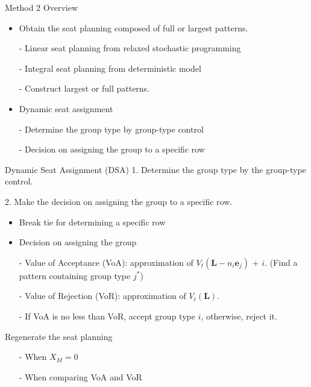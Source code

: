   \begin{frame}{Method 2 Overview}
    \begin{itemize}
      \item Obtain the seat planning composed of full or largest patterns.
      
      - Linear seat planning from relaxed stochastic programming
      
      - Integral seat planning from deterministic model
  
      - Construct largest or full patterns.
  
      \vspace{0.5cm}

      \item Dynamic seat assignment
  
      - Determine the group type by group-type control
  
      - Decision on assigning the group to a specific row

    \end{itemize}
  \end{frame}
    


    \begin{frame}{Dynamic Seat Assignment (DSA)}
      1. Determine the group type by the group-type control.

      2. Make the decision on assigning the group to a specific row.
      \begin{itemize}
        \item Break tie for determining a specific row
        \item Decision on assigning the group
        \item[-] Value of Acceptance (VoA): approximation of $V_{t} (\mathbf{L}-n_i \mathbf{e}_{j})$ + $i$. (Find a pattern containing group type $j^{*}$)
        
        \item[-] Value of Rejection (VoR): approximation of $V_{t} (\mathbf{L})$.

        \item[-] If VoA is no less than VoR, accept group type $i$, otherwise, reject it.
      \end{itemize}
      Regenerate the seat planning
      \begin{itemize}
      \item[-] When $X_{M} =0$
      \item[-] When comparing VoA and VoR 
      \end{itemize}
    \end{frame}

